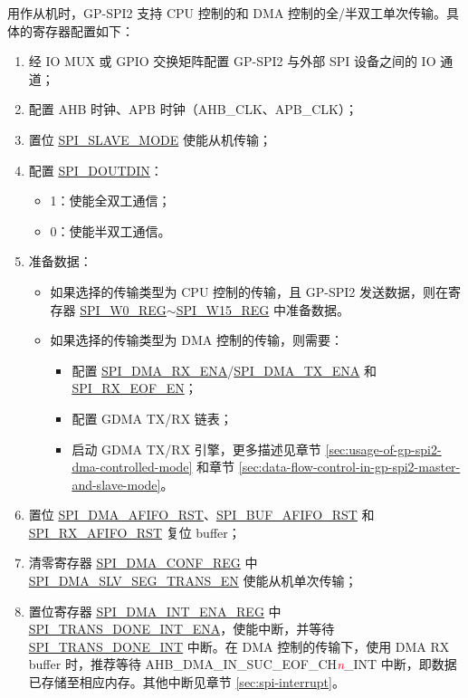 \documentclass[main\_\_CN.tex]{subfiles}
\begin{document}
用作从机时，GP-SPI2 支持 CPU 控制的和 DMA 控制的全/半双工单次传输。具体的寄存器配置如下：
\begin{enumerate}
    \item 经 IO MUX 或 GPIO 交换矩阵配置 GP-SPI2 与外部 SPI 设备之间的 IO 通道； 
    \item 配置 AHB 时钟、APB 时钟（AHB\_CLK、APB\_CLK）；
    \item 置位 \hyperref[fielddesc:SPISLAVEMODE]{SPI\_SLAVE\_MODE} 使能从机传输； 
    \item 配置 \hyperref[fielddesc:SPIDOUTDIN]{SPI\_DOUTDIN}：
    \begin{itemize}
        \item 1：使能全双工通信；
        \item 0：使能半双工通信。
    \end{itemize}
    \item 准备数据：
    \begin{itemize}
        \item 如果选择的传输类型为 CPU 控制的传输，且 GP-SPI2 发送数据，则在寄存器 \hyperref[regdesc:SPIW0REG]{SPI\_W0\_REG}$\sim$\hyperref[regdesc:SPIW15REG]{SPI\_W15\_REG} 中准备数据。
        \item 如果选择的传输类型为 DMA 控制的传输，则需要：
        \begin{itemize}
            \item 配置 \hyperref[fielddesc:SPIDMARXENA]{SPI\_DMA\_RX\_ENA}/\hyperref[fielddesc:SPIDMATXENA]{SPI\_DMA\_TX\_ENA} 和 \hyperref[fielddesc:SPIRXEOFEN]{SPI\_RX\_EOF\_EN}；
            \item 配置 GDMA TX/RX 链表；
            \item 启动 GDMA TX/RX 引擎，更多描述见章节 \ref{sec:usage-of-gp-spi2-dma-controlled-mode} 和章节 \ref{sec:data-flow-control-in-gp-spi2-master-and-slave-mode}。
        \end{itemize}
    \end{itemize}
    \item 置位 \hyperref[fielddesc:SPIDMAAFIFORST]{SPI\_DMA\_AFIFO\_RST}、\hyperref[fielddesc:SPIBUFAFIFORST]{SPI\_BUF\_AFIFO\_RST} 和 \hyperref[fielddesc:SPIRXAFIFORST]{SPI\_RX\_AFIFO\_RST} 复位 buffer；
    \item 清零寄存器 \hyperref[regdesc:SPIDMACONFREG]{SPI\_DMA\_CONF\_REG} 中 \hyperref[fielddesc:SPIDMASLVSEGTRANSEN]{SPI\_DMA\_SLV\_SEG\_TRANS\_EN} 使能从机单次传输；
    \item 置位寄存器 \hyperref[regdesc:SPIDMAINTENAREG]{SPI\_DMA\_INT\_ENA\_REG} 中 \hyperref[fielddesc:SPITRANSDONEINTENA]{SPI\_TRANS\_DONE\_INT\_ENA}，使能中断，并等待 \hyperref[int:SPITRANSDONEINT]{SPI\_TRANS\_DONE\_INT} 中断。在 DMA 控制的传输下，使用 DMA RX buffer 时，推荐等待 AHB\_DMA\_IN\_SUC\_EOF\_CH\textcolor{red}{\it{n}}\_INT 中断，即数据已存储至相应内存。其他中断见章节 \ref{sec:spi-interrupt}。
\end{enumerate}
\end{document}

